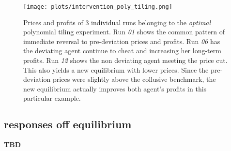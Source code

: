 \begin{figure}
	\texttt{[image: plots/intervention\_poly\_tiling.png]}
	\caption{Prices and profits of 3 individual runs belonging to the \emph{optimal } polynomial tiling experiment. Run \emph{01} shows the common pattern of immediate reversal to pre-deviation prices and profits. Run \emph{06} has the deviating agent continue to cheat and increasing her long-term profits. Run \emph{12} shows the non deviating agent meeting the price cut. This also yields a new equilibrium with lower prices. Since the pre-deviation prices were slightly above the collusive benchmark, the new equilibrium actually improves both agent's profits in this particular example.}
	\label{intervention_poly_tiling}
\end{figure}


\pagebreak
\subsection{responses off equilibrium}\label{off_path}

\textbf{TBD}